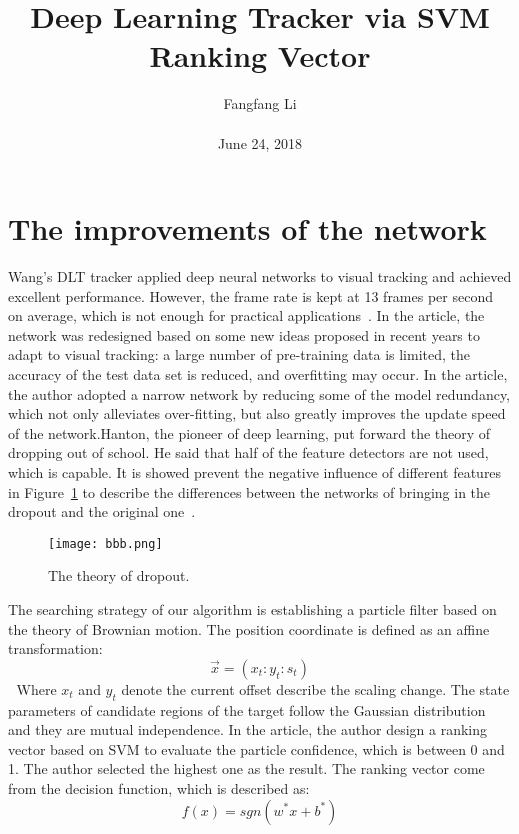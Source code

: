 \documentclass[10pt,twocolumn,letterpaper]{article}
\begin{document}
\title{\textbf{Deep Learning Tracker via SVM Ranking Vector}}
\author{Fangfang Li\\\\June 24, 2018}
\maketitle

\section{The improvements of the network}
Wang's DLT tracker applied deep neural networks to visual tracking and achieved excellent performance. However, the frame rate is kept at 13 frames per second on average, which is not enough for practical applications~\cite {krizhevsky2012imagenet}. In the article, the network was redesigned based on some new ideas proposed in recent years to adapt to visual tracking: a large number of pre-training data is limited, the accuracy of the test data set is reduced, and overfitting may occur. In the article, the author adopted a narrow network by reducing some of the model redundancy, which not only alleviates over-fitting, but also greatly improves the update speed of the network.Hanton, the pioneer of deep learning, put forward the theory of dropping out of school. He said that half of the feature detectors are not used, which is capable. It is showed prevent the  negative influence  of different features
in  Figure~\ref{fig:1} to  describe  the  differences  between the networks of bringing in the dropout and the original
one~\cite{Ahmed2015An}.

\begin{figure}[!htb]
\begin{center}
\texttt{[image: bbb.png]}
\end{center}
\caption{ The theory of dropout.}
\label{fig:1}
\end{figure}
The searching strategy of our algorithm is establishing a particle filter based on the theory of Brownian motion. The position coordinate is defined as an affine transformation:
\begin{equation}
\vec{x}=(x_t:y_t:s_t)
\end{equation} 
Where $x_t$ and $y_t$ denote the current offset describe the scaling change. The state parameters of candidate regions of the target follow the Gaussian distribution and they are mutual independence.
In the article, the author design a ranking vector based on SVM to evaluate the particle confidence, which is between 0 and 1. The author selected the highest one as the result. The ranking vector come from the decision function, which is described as:
\begin{equation}
f(x)=sgn(w^*x+b^*)
\end{equation}
\end{document}
